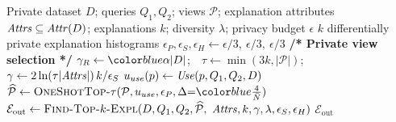 \begin{algorithm}[t]
\caption{Private-Queries-Diff-Top-$k$-Explanation}
\label{alg:main}
\begin{algorithmic}[1]
\Require Private dataset $D$; queries $Q_1,Q_2$; views $\mathcal{P}$; explanation attributes $\mathit{Attrs}\subseteq\mathit{Attr}(D)$; explanations $k$; diversity $\lambda$; privacy budget $\epsilon$
\Ensure $k$ differentially private explanation histograms
\State $\epsilon_P,\epsilon_S,\epsilon_H \gets \epsilon/3,\ \epsilon/3,\ \epsilon/3$ 
\State \textbf{/* Private view selection */}
\State $\gamma_R\gets\added{\alpha|D|}$;\ \ $\tau\gets\min(3k,|\mathcal{P}|)$;\ \ $\gamma\gets 2\ln(\tau|\mathit{Attrs}|)\,k/\epsilon_S$
\State $u_{use}(p)\gets \mathit{Use}(p,Q_1,Q_2,D)$
\State $\widehat{\mathcal{P}}\gets \textsc{OneShotTop-}\tau(\mathcal{P},u_{use},\epsilon_P,\Delta{=}\added{\tfrac{4}{\bar N}})$
\State $\mathcal{E}_{\mathrm{out}}\gets \textsc{Find-Top-$k$-Expl}(D,Q_1,Q_2,\widehat{\mathcal{P}},$
\Statex \hspace{\algorithmicindent}$\mathit{Attrs},k,\gamma,\lambda,\epsilon_S,\epsilon_H)$
\State \Return $\mathcal{E}_{\mathrm{out}}$
\end{algorithmic}
\end{algorithm}


